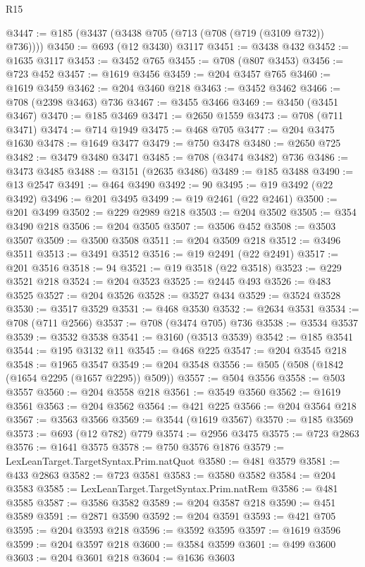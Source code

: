 \begin{lexlean}{R15}
\begin{coremodule}
{{{{{{{{{{{@3447 := @185 (@3437 (@3438 @705 (@713 (@708 (@719 (@3109 @732)) @736))))
@3450 := @693 (@12 @3430) @3117
@3451 := @3438 @432
@3452 := @1635 @3117
@3453 := @3452 @765
@3455 := @708 (@807 @3453)
@3456 := @723 @452
@3457 := @1619 @3456
@3459 := @204 @3457 @765
@3460 := @1619 @3459
@3462 := @204 @3460 @218
@3463 := @3452 @3462
@3466 := @708 (@2398 @3463) @736
@3467 := @3455 @3466
@3469 := @3450 (@3451 @3467)
@3470 := @185 @3469
@3471 := @2650 @1559
@3473 := @708 (@711 @3471)
@3474 := @714 @1949
@3475 := @468 @705
@3477 := @204 @3475 @1630
@3478 := @1649 @3477
@3479 := @750 @3478
@3480 := @2650 @725
@3482 := @3479 @3480 @3471
@3485 := @708 (@3474 @3482) @736
@3486 := @3473 @3485
@3488 := @3151 (@2635 @3486)
@3489 := @185 @3488
@3490 := @13 @2547
@3491 := @464 @3490
@3492 := 90
@3495 := @19 @3492 (@22 @3492)
@3496 := @201 @3495
@3499 := @19 @2461 (@22 @2461)
@3500 := @201 @3499
@3502 := @229 @2989 @218
@3503 := @204 @3502
@3505 := @354 @3490 @218
@3506 := @204 @3505
@3507 := @3506 @452
@3508 := @3503 @3507
@3509 := @3500 @3508
@3511 := @204 @3509 @218
@3512 := @3496 @3511
@3513 := @3491 @3512
@3516 := @19 @2491 (@22 @2491)
@3517 := @201 @3516
@3518 := 94
@3521 := @19 @3518 (@22 @3518)
@3523 := @229 @3521 @218
@3524 := @204 @3523
@3525 := @2445 @493
@3526 := @483 @3525
@3527 := @204 @3526
@3528 := @3527 @434
@3529 := @3524 @3528
@3530 := @3517 @3529
@3531 := @468 @3530
@3532 := @2634 @3531
@3534 := @708 (@711 @2566)
@3537 := @708 (@3474 @705) @736
@3538 := @3534 @3537
@3539 := @3532 @3538
@3541 := @3160 (@3513 @3539)
@3542 := @185 @3541
@3544 := @195 @3132 @11
@3545 := @468 @225
@3547 := @204 @3545 @218
@3548 := @1965 @3547
@3549 := @204 @3548
@3556 := @505 (@508 (@1842 (@1654 @2295 (@1657 @2295)) @509))
@3557 := @504 @3556
@3558 := @503 @3557
@3560 := @204 @3558 @218
@3561 := @3549 @3560
@3562 := @1619 @3561
@3563 := @204 @3562
@3564 := @421 @225
@3566 := @204 @3564 @218
@3567 := @3563 @3566
@3569 := @3544 (@1619 @3567)
@3570 := @185 @3569
@3573 := @693 (@12 @782) @779
@3574 := @2956 @3475
@3575 := @723 @2863
@3576 := @1641 @3575
@3578 := @750 @3576 @1876
@3579 := LexLeanTarget.TargetSyntax.Prim.natQuot
@3580 := @481 @3579
@3581 := @433 @2863
@3582 := @723 @3581
@3583 := @3580 @3582
@3584 := @204 @3583
@3585 := LexLeanTarget.TargetSyntax.Prim.natRem
@3586 := @481 @3585
@3587 := @3586 @3582
@3589 := @204 @3587 @218
@3590 := @451 @3589
@3591 := @2871 @3590
@3592 := @204 @3591
@3593 := @421 @705
@3595 := @204 @3593 @218
@3596 := @3592 @3595
@3597 := @1619 @3596
@3599 := @204 @3597 @218
@3600 := @3584 @3599
@3601 := @499 @3600
@3603 := @204 @3601 @218
@3604 := @1636 @3603
}}}}}}}}}}}
\end{coremodule}
\end{lexlean}
